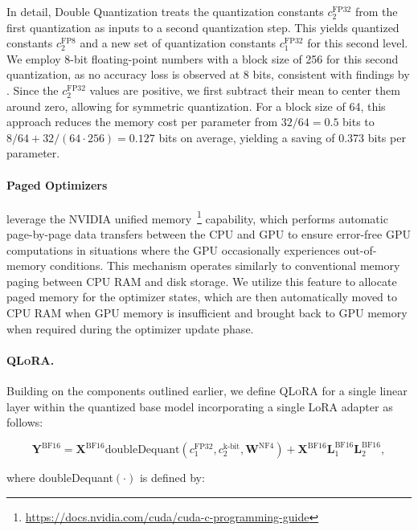 In detail, Double Quantization treats the quantization constants $c_2^{\text{FP32}}$ from the first quantization as inputs to a second quantization step. This yields quantized constants $c_2^{\text{FP8}}$ and a new set of quantization constants $c_1^{\text{FP32}}$ for this second level. We employ 8-bit floating-point numbers with a block size of 256 for this second quantization, as no accuracy loss is observed at 8 bits, consistent with findings by \citet{dettmers2022case}. Since the $c_2^{\text{FP32}}$ values are positive, we first subtract their mean to center them around zero, allowing for symmetric quantization. For a block size of 64, this approach reduces the memory cost per parameter from $32/64 = 0.5$ bits to $8/64 + 32/(64 \cdot 256) = 0.127$ bits on average, yielding a saving of 0.373 bits per parameter.

\paragraph{Paged Optimizers} leverage the NVIDIA unified memory~\footnote{\tiny \url{https://docs.nvidia.com/cuda/cuda-c-programming-guide}} capability, which performs automatic page-by-page data transfers between the CPU and GPU to ensure error-free GPU computations in situations where the GPU occasionally experiences out-of-memory conditions. This mechanism operates similarly to conventional memory paging between CPU RAM and disk storage. We utilize this feature to allocate paged memory for the optimizer states, which are then automatically moved to CPU RAM when GPU memory is insufficient and brought back to GPU memory when required during the optimizer update phase.

\paragraph{\textsc{QLoRA}.} Building on the components outlined earlier, we define \textsc{QLoRA} for a single linear layer within the quantized base model incorporating a single LoRA adapter as follows:

\begin{equation}
    \mathbf{Y}^{\text{BF16}} =  \mathbf{X}^{\text{BF16}} \text{doubleDequant}(c_1^{\text{FP32}}, c_2^{\text{k-bit}}, \mathbf{W}^{\text{NF4}}) + \mathbf{X}^{\text{BF16}}\mathbf{L}^{\text{BF16}}_1\mathbf{L}^{\text{BF16}}_2,
\end{equation}

where doubleDequant$(\cdot)$ is defined by:

